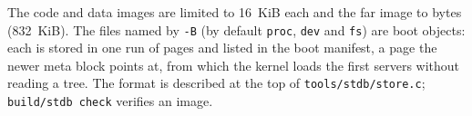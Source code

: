 The code and data images are limited to 16~KiB each and the far image to  bytes
(832~KiB). The files named by \texttt{-B} (by default \texttt{proc}, \texttt{dev} and \texttt{fs}) are
boot objects: each is stored in one run of pages and listed in the boot manifest, a page the newer
meta block points at, from which the kernel loads the first servers without reading a tree. The
format is described at the top of \texttt{tools/stdb/store.c}; \texttt{build/stdb check} verifies an
image.
